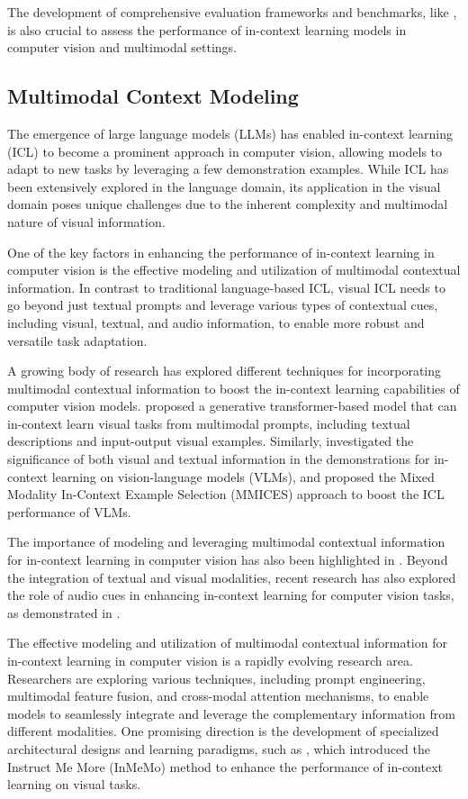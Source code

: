 \documentclass[11pt]{article}
\begin{document}
The development of comprehensive evaluation frameworks and benchmarks, like \cite{ref184}, is also crucial to assess the performance of in-context learning models in computer vision and multimodal settings.

\subsection{Multimodal Context Modeling}

The emergence of large language models (LLMs) \cite{ref232} has enabled in-context learning (ICL) to become a prominent approach in computer vision, allowing models to adapt to new tasks by leveraging a few demonstration examples. While ICL has been extensively explored in the language domain, its application in the visual domain poses unique challenges due to the inherent complexity and multimodal nature of visual information.

One of the key factors in enhancing the performance of in-context learning in computer vision is the effective modeling and utilization of multimodal contextual information. In contrast to traditional language-based ICL, visual ICL needs to go beyond just textual prompts and leverage various types of contextual cues, including visual, textual, and audio information, to enable more robust and versatile task adaptation.

A growing body of research has explored different techniques for incorporating multimodal contextual information to boost the in-context learning capabilities of computer vision models. \cite{ref148} proposed a generative transformer-based model that can in-context learn visual tasks from multimodal prompts, including textual descriptions and input-output visual examples. Similarly, \cite{ref132} investigated the significance of both visual and textual information in the demonstrations for in-context learning on vision-language models (VLMs), and proposed the Mixed Modality In-Context Example Selection (MMICES) approach to boost the ICL performance of VLMs.

The importance of modeling and leveraging multimodal contextual information for in-context learning in computer vision has also been highlighted in \cite{ref184}. Beyond the integration of textual and visual modalities, recent research has also explored the role of audio cues in enhancing in-context learning for computer vision tasks, as demonstrated in \cite{ref231}.

The effective modeling and utilization of multimodal contextual information for in-context learning in computer vision is a rapidly evolving research area. Researchers are exploring various techniques, including prompt engineering, multimodal feature fusion, and cross-modal attention mechanisms, to enable models to seamlessly integrate and leverage the complementary information from different modalities. One promising direction is the development of specialized architectural designs and learning paradigms, such as \cite{ref9}, which introduced the Instruct Me More (InMeMo) method to enhance the performance of in-context learning on visual tasks.
\end{document}
